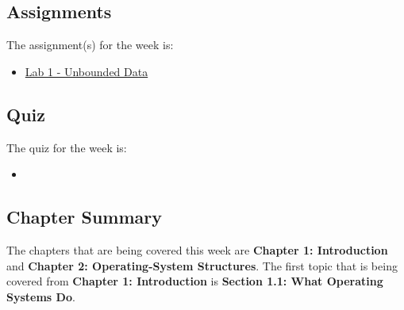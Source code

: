 \subsection{Assignments}

The assignment(s) for the week is:

\begin{itemize}
    \item \href{https://github.com/cu-cspb-3753-fall-2024/lab-1-QuantumCompiler}{Lab 1 - Unbounded Data}
\end{itemize}

\subsection{Quiz}

The quiz for the week is:

\begin{itemize}
    \item {}
\end{itemize}

\newpage

\subsection{Chapter Summary}

The chapters that are being covered this week are \textbf{Chapter 1: Introduction} and \textbf{Chapter 2: Operating-System Structures}. The first topic that is being covered from \textbf{Chapter 1: Introduction}
is \textbf{Section 1.1: What Operating Systems Do}.

